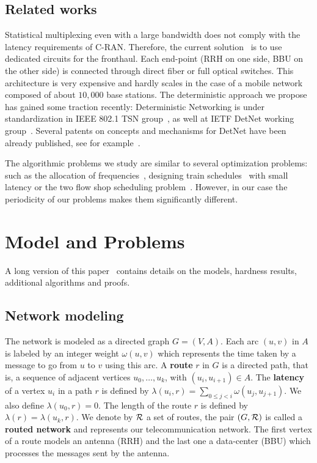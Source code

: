 \documentclass[a4paper,10pt]{IEEEtran}
\begin{document}
 \subsection*{Related works}

 Statistical multiplexing even with a large bandwidth does not comply with the latency requirements of C-RAN. Therefore, the current solution~\cite{pizzinat2015things,tayq2017real} is to use dedicated circuits for the fronthaul. Each end-point (RRH on one side, BBU on the other side) is connected through direct fiber or full optical switches. This architecture is very expensive and hardly scales in the case of a mobile network composed of about $10,000$ base stations. The deterministic approach we propose has gained some traction recently: Deterministic Networking is under standardization in IEEE 802.1 TSN group~\cite{finn-detnet-architecture-08}, as well at IETF DetNet working group~\cite{ieee802}. Several patents on concepts and mechanisms for DetNet have been already published, see for example~\cite{howe2005time,leclerc2016transmission}. 
     
The algorithmic problems we study are similar to several optimization problems: such as the allocation of frequencies~\cite{borndorfer1998frequency}, designing train schedules~\cite{strotmann2007railway} with small latency or the two flow shop scheduling problem~\cite{yu2004minimizing}. However, in our case the periodicity of our problems makes them significantly different.


\section{Model and Problems}\label{sec:def}

A long version of this paper~\cite{versionlongue} contains details on the models, hardness results, 
additional algorithms and proofs.  

  \subsection{Network modeling}
  

The network is modeled as a directed graph $G=(V,A)$. Each arc  $(u,v)$ in $A$ is labeled by an integer weight $\omega(u,v)$ which represents the time taken by a message to go from $u$ to $v$ using this arc. A {\bf route} $r$ in $G$ is a directed path, that is, a sequence of adjacent vertices $u_0, \ldots , u_{k}$, with $(u_i,u_{i+1}) \in A$.  The {\bf latency} of a vertex $u_i$ in a path $r$ is defined by $\lambda(u_i,r)= \sum\limits_{0 \leq j <i} \omega(u_j, u_{j+1})$. We also define $\lambda(u_0,r)=0$. The length of the route $r$ is defined by $\lambda (r)= \lambda (u_k,r)$.
We denote by $\cal R$ a set of routes, the pair $(G,\cal R)$ is called a {\bf routed network} and represents our telecommunication network.
The first vertex of a route models an antenna (RRH) and the last one a data-center (BBU) which processes the messages sent by the antenna.
\end{document}
